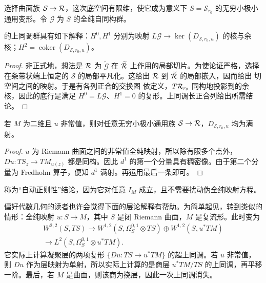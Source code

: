选择曲面族 $\mathcal S\to\mathcal R$，这次底空间有限维，使它成为意义下 $S=\mathcal S_{r_0}$ 的无穷小极小通用变形。令 $\mathcal G$ 为 $S$ 的全纯自同构群。
\begin{lemma}\label{st:13.1}
的上同调群具有如下解释：$H^0,\allowbreak H^1$ 分别为映射 $L\mathcal G\to\ker(D_{\mathcal S,\allowbreak r_0,\allowbreak u})$ 的核与余核；$H^2=\operatorname{coker}(D_{\mathcal S,\allowbreak r_0,\allowbreak u})$。
\end{lemma}
\begin{proof}
非正式地，想法是 $\mathcal R$ 为 $\widetilde{\mathcal G}$ 在 $\widetilde{\mathcal R}$ 上作用的局部切片。为使论证严格，选择在条带状端上恒定的 $\mathcal S$ 的局部平凡化。这给出 $\mathcal R$ 到 $\widetilde{\mathcal R}$ 的局部嵌入，因而给出
切空间之间的映射。于是有各列正合的交换图
依定义，$T\mathcal R_{r_0}$ 同构地投影到的余核，因此的底行是满足 $H^0=L\mathcal G$、$H^1=0$ 的复形。上同调长正合列给出所需结论。
\end{proof}
\begin{lemma}\label{st:13.2}
若 $M$ 为二维且 $u$ 非常值，则对任意无穷小极小通用族 $\mathcal S\to\mathcal R$，$D_{\mathcal S,\allowbreak r_0,\allowbreak u}$ 均为满射。
\end{lemma}
\begin{proof}
$u$ 为 Riemann 曲面之间的非常值全纯映射，所以除有限多个点外，$Du:TS_z\to TM_{u(z)}$ 都是同构。因此 $d^1$ 的第一个分量具有稠密像。由于第二个分量为 Fredholm 算子，便知 $d^1$ 满射。再运用最后一条即可。
\end{proof}
称为“自动正则性”结论，因为它对任意 $I_M$ 成立，且不需要扰动伪全纯映射方程。
\begin{note}\label{st:13.3}
偏好代数几何的读者也许会觉得下面的层论解释有帮助。为简单起见，转到类似的情形：全纯映射 $u:S\to M$，其中 $S$ 是闭 Riemann 曲面，$M$ 是复流形。此时变为
\[
\begin{gathered}
W^{2,2}(S,TS)\longrightarrow
W^{1,2}(S,\Omega_S^{0,1}\otimes TS)\oplus W^{1,2}(S,u^*TM)\\
\longrightarrow L^2(S,\Omega_S^{0,1}\otimes u^*TM).
\end{gathered}
\]
它实际上计算凝聚层的两项复形 $\{Du:TS\to u^*TM\}$ 的超上同调。若 $u$ 非常值，则 $Du$ 作为层映射为单射，所以实际上计算的是商层 $u^*TM/TS$ 的上同调，再平移一阶。最后，若 $M$ 是曲面，则该商为挠层，因此一次上同调消失。
\end{note}

